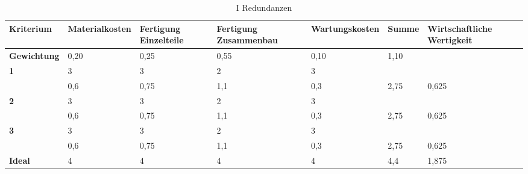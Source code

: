 \documentclass[10pt,a4paper]{article}
\begin{document}
\begin{table}[h!]
    \centering
    \hspace*{0in} %
    \begin{tabular}{>{\bfseries}p{2cm} p{2.2cm} p{2cm} p{2cm} p{2.5cm} p{2cm} p{2cm}}
        \toprule
        Kriterium  & Materialkosten & Fertigung Einzelteile & Fertigung Zusammenbau & Wartungskosten & Summe & Wirtschaftliche Wertigkeit \\
        \midrule
        Gewichtung & 0,20           & 0,25                  & 0,55                  & 0,10           & 1,10  &                            \\
        \midrule
        1          & 3              & 3                     & 2                     & 3              &       &                            \\
                   & 0,6            & 0,75                  & 1,1                   & 0,3            & 2,75  & 0,625                      \\
        \midrule
        2          & 3              & 3                     & 2                     & 3              &       &                            \\
                   & 0,6            & 0,75                  & 1,1                   & 0,3            & 2,75  & 0,625                      \\
        \midrule
        3          & 3              & 3                     & 2                     & 3              &       &                            \\
                   & 0,6            & 0,75                  & 1,1                   & 0,3            & 2,75  & 0,625                      \\
        \midrule
        Ideal      & 4              & 4                     & 4                     & 4              & 4,4   & 1,875                      \\
        \bottomrule
    \end{tabular}
    \caption{I Redundanzen}
\end{table}
\end{document}

